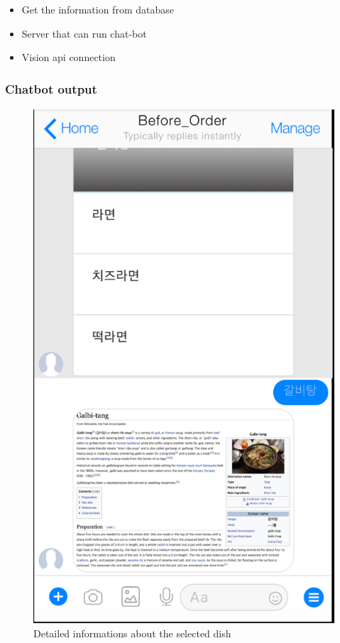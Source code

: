 \begin{itemize}
\item Get the information from database
\item Server that can run chat-bot
\item Vision api connection
\end{itemize}
\FloatBarrier

\subsubsection{Chatbot output}

\begin{figure}[htbp]
\centerline{\includegraphics[height=\custompicheight]{./pictures/facebook_dish_information}}
\caption{Detailed informations about the selected dish}
\label{fig:facebook_dish_information}
\end{figure}
\FloatBarrier

